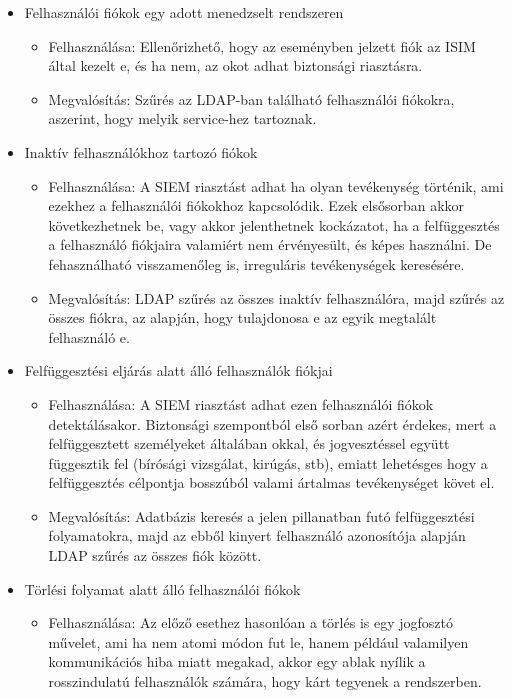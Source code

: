 \begin{itemize}
	\item Felhasználói fiókok egy adott menedzselt rendszeren
	\begin{itemize}
		\small
		\item Felhasználása: Ellenőrizhető, hogy az eseményben jelzett fiók az ISIM által kezelt e, és ha nem, az okot adhat biztonsági riasztásra.
		\item Megvalósítás: Szűrés az LDAP-ban található felhasználói fiókokra, aszerint, hogy melyik service-hez tartoznak.
	\end{itemize} 
	\item Inaktív felhasználókhoz tartozó fiókok
	\begin{itemize}
		\small
		\item Felhasználása: A SIEM riasztást adhat ha olyan tevékenység történik, ami ezekhez a felhasználói fiókokhoz kapcsolódik. Ezek elsősorban akkor következhetnek be, vagy akkor jelenthetnek kockázatot, ha a felfüggesztés a felhasználó fiókjaira valamiért nem érvényesült, és képes használni. De fehasználható visszamenőleg is, irreguláris tevékenységek keresésére.
		\item Megvalósítás: LDAP szűrés az összes inaktív felhasználóra, majd szűrés az összes fiókra, az alapján, hogy tulajdonosa e az egyik megtalált felhasználó e.
	\end{itemize}
	\item Felfüggesztési eljárás alatt álló felhasználók fiókjai
	\begin{itemize}
		\small
		\item Felhasználása: A SIEM riasztást adhat ezen felhasználói fiókok detektálásakor. Biztonsági szempontból első sorban azért érdekes, mert a felfüggesztett személyeket általában okkal, és jogvesztéssel együtt függesztik fel (bírósági vizsgálat, kirúgás, stb), emiatt lehetésges hogy a felfüggesztés célpontja bosszúból valami ártalmas tevékenységet követ el.
		\item Megvalósítás: Adatbázis keresés a jelen pillanatban futó felfüggesztési folyamatokra, majd az ebből kinyert felhasználó azonosítója alapján LDAP szűrés az összes fiók között.
	\end{itemize}
	\item Törlési folyamat alatt álló felhasználói fiókok
	\begin{itemize}
		\small
		\item Felhasználása: Az előző esethez hasonlóan a törlés is egy jogfosztó művelet, ami ha nem atomi módon fut le, hanem például valamilyen kommunikációs hiba miatt megakad, akkor egy ablak nyílik a rosszindulatú felhasználók számára, hogy kárt tegyenek a rendszerben.

\end{itemize}
\end{itemize}
